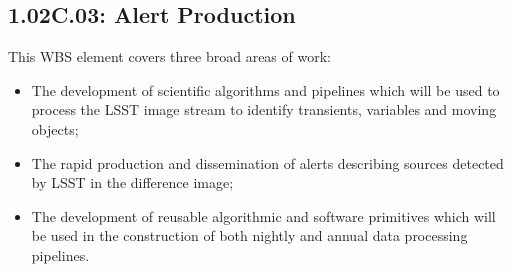 \subsection{1.02C.03: Alert Production}

This WBS element covers three broad areas of work:

\begin{itemize}

  \item{The development of scientific algorithms and pipelines which will be
  used to process the LSST image stream to identify transients, variables and
  moving objects;}

  \item{The rapid production and dissemination of alerts describing
  sources detected by LSST in the difference image;}

  \item{The development of reusable algorithmic and software primitives which
  will be used in the construction of both nightly and annual data processing
  pipelines.}

\end{itemize}
